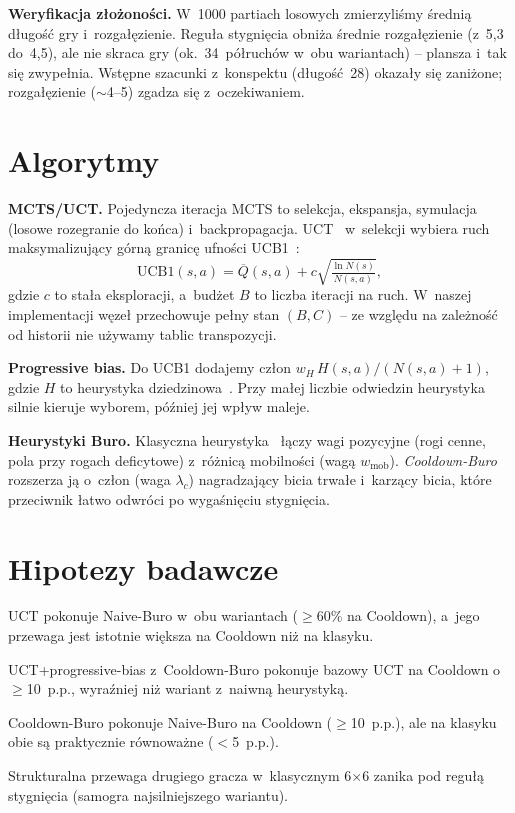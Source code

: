 \documentclass[12pt,a4paper]{article}
\begin{document}
\textbf{Weryfikacja złożoności.} W~1000 partiach losowych zmierzyliśmy średnią długość gry
i~rozgałęzienie. Reguła stygnięcia obniża średnie rozgałęzienie (z~5,3 do~4,5), ale nie skraca gry
(ok.\ 34~półruchów w~obu wariantach) -- plansza i~tak się zwypełnia. Wstępne szacunki z~konspektu
(długość~28) okazały się zaniżone; rozgałęzienie ($\sim$4--5) zgadza się z~oczekiwaniem.

\section{Algorytmy}
\textbf{MCTS/UCT.} Pojedyncza iteracja MCTS to selekcja, ekspansja, symulacja (losowe rozegranie do
końca) i~backpropagacja. UCT~\cite{kocsis2006bandit} w~selekcji wybiera ruch maksymalizujący górną
granicę ufności UCB1~\cite{auer2002finite}:
\[ \mathrm{UCB1}(s,a) = \overline{Q}(s,a) + c\sqrt{\tfrac{\ln N(s)}{N(s,a)}}, \]
gdzie $c$ to stała eksploracji, a~budżet $B$ to liczba iteracji na ruch. W~naszej implementacji węzeł
przechowuje pełny stan $(B,C)$ -- ze względu na zależność od historii nie używamy tablic
transpozycji.

\textbf{Progressive bias.} Do UCB1 dodajemy człon $w_H\,H(s,a)/(N(s,a)+1)$, gdzie $H$ to heurystyka
dziedzinowa~\cite{chaslot2008progressive}. Przy małej liczbie odwiedzin heurystyka silnie kieruje
wyborem, później jej wpływ maleje.

\textbf{Heurystyki Buro.} Klasyczna heurystyka~\cite{buro1997evaluation} łączy wagi pozycyjne (rogi
cenne, pola przy rogach deficytowe) z~różnicą mobilności (wagą $w_{\text{mob}}$). \emph{Cooldown-Buro}
rozszerza ją o~człon (waga $\lambda_c$) nagradzający bicia trwałe i~karzący bicia, które przeciwnik
łatwo odwróci po wygaśnięciu stygnięcia.

\section{Hipotezy badawcze}
\begin{description}[leftmargin=2.2em,itemsep=2pt]
  \item[H1] UCT pokonuje Naive-Buro w~obu wariantach ($\geq$60\% na Cooldown), a~jego przewaga jest
    istotnie większa na Cooldown niż na klasyku.
  \item[H2] UCT+progressive-bias z~Cooldown-Buro pokonuje bazowy UCT na Cooldown o~$\geq$10~p.p.,
    wyraźniej niż wariant z~naiwną heurystyką.
  \item[H3] Cooldown-Buro pokonuje Naive-Buro na Cooldown ($\geq$10~p.p.), ale na klasyku obie są
    praktycznie równoważne ($<$5~p.p.).
  \item[H4] Strukturalna przewaga drugiego gracza w~klasycznym 6$\times$6 zanika pod regułą
    stygnięcia (samogra najsilniejszego wariantu).
\end{description}
\end{document}
